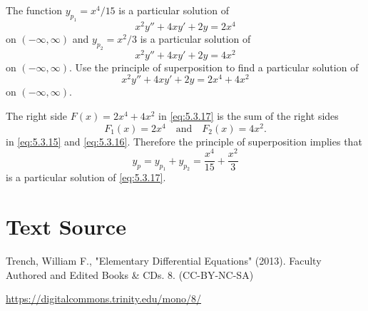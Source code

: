 \documentclass{ximera}
\begin{document}
\begin{example}\label{example:5.3.4}
The function
 $y_{p_1}=x^4/15$ is a   particular solution of
\begin{equation} \label{eq:5.3.15}
x^2y''+4xy'+2y=2x^4
\end{equation}
on $(-\infty,\infty)$
and  $y_{p_2}=x^2/3$  is a particular solution of
\begin{equation} \label{eq:5.3.16}
x^2y''+4xy'+2y=4x^2
\end{equation}
on $(-\infty,\infty)$.
Use  the principle of superposition to
find a particular solution of
\begin{equation} \label{eq:5.3.17}
x^2y''+4xy'+2y=2x^4+4x^2
\end{equation}
on $(-\infty,\infty)$.
 
 
\begin{explanation}  The right side $F(x)=2x^4+4x^2$ in \eqref{eq:5.3.17}
is the sum of the right sides
$$
F_1(x)=2x^4\quad\mbox{and}\quad F_2(x)=4x^2.
$$
in  \eqref{eq:5.3.15}  and \eqref{eq:5.3.16}.
Therefore the principle of superposition implies that
$$
y_p=y_{p_1}+y_{p_2}=\frac{x^4}{15}+\frac{x^2}{3}
$$
is a particular solution of \eqref{eq:5.3.17}.
\end{explanation}
\end{example}
 
\section*{Text Source}
Trench, William F., "Elementary Differential Equations" (2013). Faculty Authored and Edited Books \& CDs. 8. (CC-BY-NC-SA)
 
\href{https://digitalcommons.trinity.edu/mono/8/}{https://digitalcommons.trinity.edu/mono/8/}
 
\end{document}
